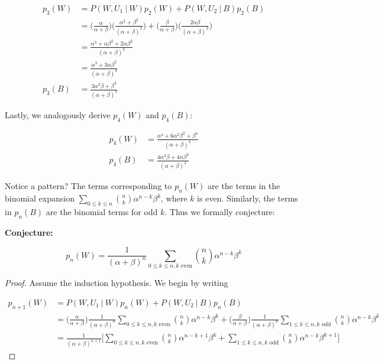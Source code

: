 \documentclass[10pt, oneside]{article}
\begin{document}
\begin{enumerate}[label=3.\arabic*]
\begin{align*}
p_3 (W) &= P(W, U_1 \ | \ W) p_2 (W) + P(W, U_2 \ | \ B) p_2 (B) \\
&= \bigg( \frac{\alpha}{\alpha + \beta} \bigg) \bigg( \frac{\alpha^2 + \beta^2}{(\alpha + \beta)^2} \bigg) + \bigg( \frac{\beta}{\alpha + \beta} \bigg) \bigg( \frac{2\alpha \beta}{(\alpha + \beta)^2} \bigg) \\
&= \frac{\alpha^3 + \alpha \beta^2 + 2\alpha \beta^2}{(\alpha + \beta)^3} \\
&= \boxed{ \frac{\alpha^3 + 3 \alpha \beta^2}{(\alpha + \beta)^3} } \\
p_3 (B) &= \boxed{ \frac{3\alpha^2 \beta + \beta^3}{(\alpha + \beta)^3} }
\end{align*}

Lastly, we analogously derive $p_4 (W)$ and $p_4 (B)$:

\begin{align*}
p_4 (W) &= \boxed{ \frac{\alpha^4 + 6 \alpha^2 \beta^2 + \beta^4}{(\alpha + \beta)^4} } \\
p_4 (B) &= \boxed{ \frac{4\alpha^3 \beta + 4\alpha \beta^3}{(\alpha + \beta)^4} }
\end{align*}

Notice a pattern? The terms corresponding to $p_n(W)$ are the terms in the binomial expansion $\sum_{0 \leq k \leq n} \binom{n}{k} \alpha^{n-k} \beta^k$, where $k$ is even. Similarly, the terms in $p_n (B)$ are the binomial terms for odd $k$. Thus we formally conjecture:

\textbf{Conjecture:}

\[ p_n(W) = \frac{1}{(\alpha + \beta)^n} \sum_{0 \leq k \leq n, k \text{ even}} \binom{n}{k} \alpha^{n - k} \beta^k \]

\begin{proof}
Assume the induction hypothesis. We begin by writing

\begin{align*}
p_{n+1} (W) &= P(W, U_1 \ | \ W) p_n (W) + P(W, U_2 \ | \ B) p_n (B) \\
&= \bigg( \frac{\alpha}{\alpha + \beta} \bigg) \frac{1}{(\alpha + \beta)^n} \sum_{0 \leq k \leq n, k \text{ even}} \binom{n}{k} \alpha^{n - k} \beta^k + \bigg( \frac{\beta}{\alpha + \beta} \bigg) \frac{1}{(\alpha + \beta)^n} \sum_{1 \leq k \leq n, k \text{ odd}} \binom{n}{k} \alpha^{n - k} \beta^k \\
&= \frac{1}{(\alpha + \beta)^{n+1}} \bigg[ \sum_{0 \leq k \leq n, k \text{ even}} \binom{n}{k} \alpha^{n - k + 1} \beta^k + \sum_{1 \leq k \leq n, k \text{ odd}} \binom{n}{k} \alpha^{n - k} \beta^{k+1} \bigg]
\end{align*}


\end{proof}
\end{enumerate}
\end{document}
